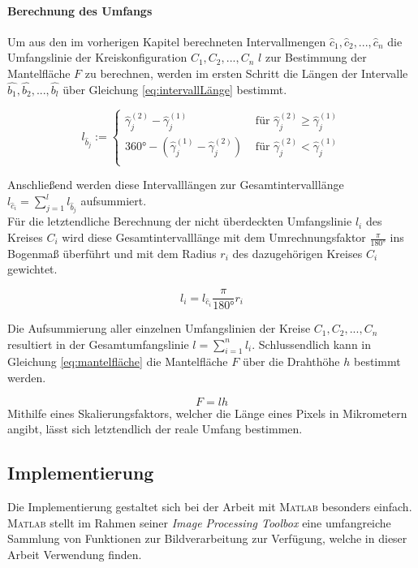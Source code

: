 \documentclass[accentcolor=tud1c, 11pt, toc=bib, toc=listof, captions=abovetable, parskip=half]{tudreport}
\begin{document}
\paragraph{Berechnung des Umfangs}
Um aus den im vorherigen Kapitel berechneten Intervallmengen $\hat{c}_1,\hat{c}_2,...,\hat{c}_n$ die Umfangslinie der Kreiskonfiguration $C_1, C_2,...,C_n$ $l$ zur Bestimmung der Mantelfläche $F$ zu berechnen, werden im ersten Schritt die Längen der Intervalle $\hat{b_1}, \hat{b_2},...,\hat{b_l}$ über Gleichung \ref{eq:intervallLänge} bestimmt.

\begin{equation} 
l_{\hat{b}_j} := \begin{cases} 
      \hat{\gamma}^{(2)}_j - \hat{\gamma}^{(1)}_j & \mbox{ für } \hat{\gamma}^{(2)}_j \geq \hat{\gamma}^{(1)}_j \\
      \ang{360} - \left( \hat{\gamma}^{(1)}_j - \hat{\gamma}^{(2)}_j \right) & \mbox{ für } \hat{\gamma}^{(2)}_j <  \hat{\gamma}^{(1)}_j \\
   \end{cases}
\label{eq:intervallLänge}
\end{equation}

Anschließend werden diese Intervalllängen zur Gesamtintervalllänge $l_{\hat{c}_i} = \sum\nolimits_{j=1}^l l_{\hat{b}_j}$ aufsummiert. \\
Für die letztendliche Berechnung der nicht überdeckten Umfangslinie $l_i$ des Kreises $C_i$ wird diese Gesamtintervalllänge mit dem Umrechnungsfaktor $\frac{\pi}{\ang{180}}$ ins Bogenmaß überführt und mit dem Radius $r_i$ des dazugehörigen Kreises $C_i$ gewichtet.

\begin{equation}
l_i = l_{\hat{c}_i} \frac{\pi}{\ang{180}} r_i
\end{equation}

Die Aufsummierung aller einzelnen Umfangslinien der Kreise $C_1,C_2,...,C_n$ resultiert in der Gesamtumfangslinie $l = \sum\nolimits_{i=1}^n l_i$. Schlussendlich kann in Gleichung \ref{eq:mantelfläche} die Mantelfläche $F$ über die Drahthöhe $h$ bestimmt werden.

\begin{equation}
F = lh
\label{eq:mantelfläche}
\end{equation}
Mithilfe eines Skalierungsfaktors, welcher die Länge eines Pixels in Mikrometern angibt, lässt sich letztendlich der reale Umfang bestimmen.

\subsection{Implementierung}
Die Implementierung gestaltet sich bei der Arbeit mit \textsc{Matlab} besonders einfach. \textsc{Matlab} stellt im Rahmen seiner \textit{Image Processing Toolbox} eine umfangreiche Sammlung von Funktionen zur Bildverarbeitung zur Verfügung, welche in dieser Arbeit Verwendung finden.
\end{document}

